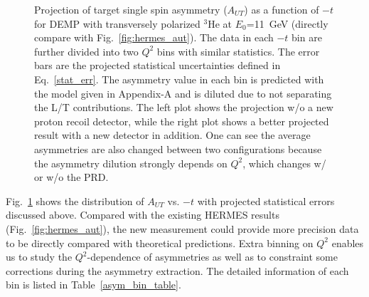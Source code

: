 \begin{figure}[!ht]
 \begin{center}
      \caption{\footnotesize{Projection of target single spin asymmetry
          ($A_{UT}$) as a function of $-t$ for DEMP with transversely polarized
          $\mathrm{^{3}He}$ at $E_{0}$=11~GeV (directly compare with
Fig.~\ref{fig:hermes_aut}).  The data in each $-t$ bin are further divided into
two $Q^{2}$ bins with similar statistics.  The error bars are the projected
statistical uncertainties defined in Eq.~\ref{stat_err}. The asymmetry value in
each bin is predicted with the model given in Appendix-A and is diluted due to
not separating the L/T contributions. The left plot shows the projection w/o a
new proton recoil detector, while the right plot shows a better projected
result with a new detector in addition. One can see the average asymmetries are
also changed between two configurations because the asymmetry dilution
strongly depends on $Q^{2}$, which changes w/ or w/o the PRD.}}
  \label{asym_t}
  \end{center}
\end{figure}

Fig.~\ref{asym_t} shows the distribution of $A_{UT}$ vs. $-t$ with projected
statistical errors discussed above. Compared with the existing HERMES results
(Fig.~\ref{fig:hermes_aut}), the new measurement could provide more precision
data to be directly compared with theoretical predictions. Extra binning on
$Q^{2}$ enables us to study the $Q^{2}$-dependence of asymmetries as well as to
constraint some corrections during the asymmetry extraction.  The detailed
information of each bin is listed in Table~\ref{asym_bin_table}.

